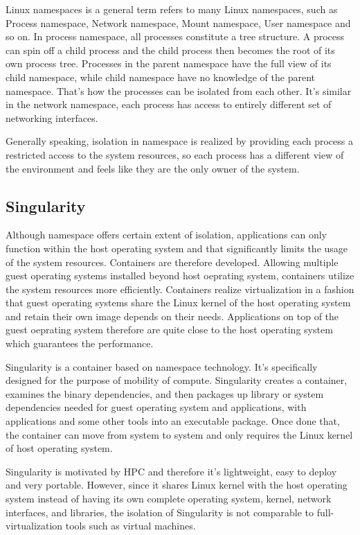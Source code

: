 \documentclass{article}
\begin{document}
Linux namespaces\cite{rosen2013resource} is a general term refers to many Linux namespaces, such as Process namespace, Network namespace, Mount namespace, User namespace and so on. In process namespace, all processes constitute a tree structure. A process can spin off a child process and the child process then becomes the root of its own process tree. Processes in the parent namespace have the full view of its child namespace, while child namespace have no knowledge of the parent namespace. That's how the processes can be isolated from each other. It's similar in the network namespace, each process has access to entirely different set of networking interfaces. 

Generally speaking, isolation in namespace is realized by providing each process a restricted access to the system resources, so each process has a different view of the environment and feels like they are the only owner of the system. 


\subsection{Singularity}

Although namespace offers certain extent of isolation, applications can only function within the host operating system and that significantly limits the usage of the system resources. Containers are therefore developed. Allowing multiple guest operating systems installed beyond host oeprating system, containers utilize the system resources more efficiently. Containers realize virtualization in a fashion that guest operating systems share the Linux kernel of the host operating system and retain their own image depends on their needs. Applications on top of the guest oeprating system therefore are quite close to the host operating system which guarantees the performance. 

Singularity\cite{singularity} is a container based on namespace technology. It's specifically designed for the purpose of mobility of compute. Singularity creates a container, examines the binary dependencies, and then packages up library or system dependencies needed for guest operating system and applications, with applications and some other tools into an executable package. Once done that, the container can move from system to system and only requires the Linux kernel of host operating system.

Singularity is motivated by HPC and therefore it's lightweight, easy to deploy and very portable. However, since it shares Linux kernel with the host operating system instead of having its own complete operating system, kernel, network interfaces, and libraries, the isolation of Singularity is not comparable to full-virtualization tools such as virtual machines.
\end{document}
